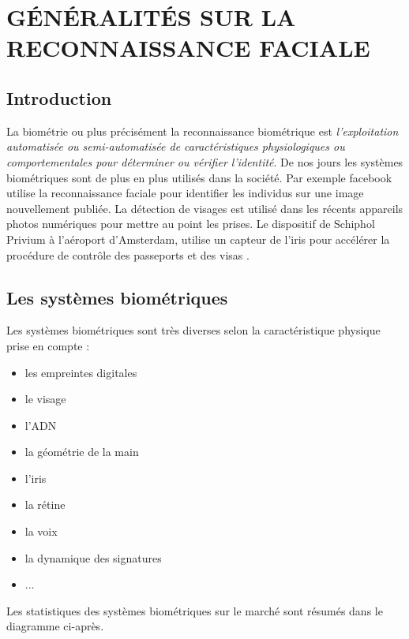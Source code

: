 


 
\chapter{GÉNÉRALITÉS SUR LA RECONNAISSANCE FACIALE}

\section{Introduction}
La biométrie ou plus précisément la reconnaissance biométrique est \og \textit{l'exploitation automatisée ou semi-automatisée de caractéristiques physiologiques ou comportementales pour déterminer ou vérifier l'identité}\fg{}\citep{bio}.
De nos jours les systèmes biométriques sont de plus en plus utilisés dans la société. Par exemple facebook utilise la reconnaissance faciale pour identifier les individus sur une image nouvellement publiée. La détection de visages est utilisé dans les récents appareils photos numériques pour mettre au point les prises. Le dispositif de Schiphol Privium à l'aéroport d'Amsterdam, utilise un capteur  de  l'iris  pour  accélérer  la  procédure  de  contrôle  des  passeports  et  des  visas \citep{cnn}.

\section{Les systèmes biométriques}
 Les systèmes biométriques sont très diverses selon la caractéristique physique prise en compte : 
\begin{itemize}
	\item les empreintes digitales
	\item le visage
	\item l'ADN
	\item la géométrie de la main
	\item l'iris
	\item la rétine
	\item la voix
	\item la dynamique des signatures
	\item ...
\end{itemize}

Les statistiques des systèmes biométriques sur le marché sont résumés dans le diagramme ci-après.

